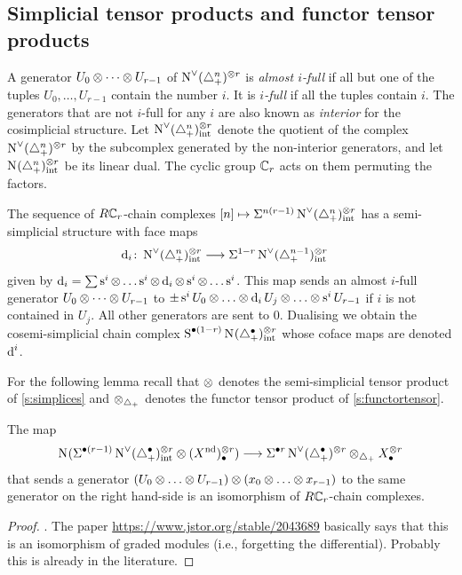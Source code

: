\subsection{Simplicial tensor products and functor tensor products}
A generator $U_0\otimes\cdots \otimes U_{r-1}$ of $\operatorname{N}^\vee_{}(\triangle_{+}^n)^{\otimes r}$ is \emph{almost $i$-full} if all but one of the tuples $U_0,\ldots,U_{r-1}$ contain the number $i$. It is \emph{$i$-full} if all the tuples contain $i$. The generators that are not $i$-full for any $i$ are also known as \emph{interior} for the cosimplicial structure. Let $\operatorname{N}^\vee_{}(\triangle_{+}^n)^{\otimes r}_{\mathrm{int}}$ denote the quotient of the complex $\operatorname{N}^\vee_{}(\triangle_{+}^n)^{\otimes r}$ by the subcomplex generated by the non-interior generators, and let $\operatorname{N}_{}(\triangle_{+}^n)^{\otimes r}_{\mathrm{int}}$ be its linear dual. The cyclic group $\mathbb{C}_r$ acts on them permuting the factors.
\begin{definition}
	The sequence of $R\mathbb{C}_r$-chain complexes $[n]\mapsto \Sigma^{n(r-1)}\operatorname{N}^\vee_{}(\triangle_{+}^{n})^{\otimes r}_{\mathrm{int}}$ has a semi-simplicial structure with face maps 
	\begin{align*}
		\operatorname{d}_i\colon \operatorname{N}^\vee_{}(\triangle_{+}^n)^{\otimes r}_{\mathrm{int}} &\longrightarrow
		\Sigma^{1-r}\operatorname{N}^\vee_{}(\triangle_{+}^{n-1})^{\otimes r}_{\mathrm{int}}	
	\end{align*}
	given by $\operatorname{d}_i = \sum \operatorname{s}^i\otimes \ldots \operatorname{s}^i\otimes\operatorname{d}_i\otimes \operatorname{s}^i \otimes \ldots \operatorname{s}^i$. This map sends an almost $i$-full generator $U_0\otimes \cdots \otimes U_{r-1}$ to $\pm \operatorname{s}^iU_0\otimes\ldots\otimes \operatorname{d}_iU_j\otimes\ldots\otimes \operatorname{s}^iU_{r-1}$ if $i$ is not contained in $U_j$. All other generators are sent to $0$. Dualising we obtain the cosemi-simplicial chain complex $\operatorname{S}^{\bullet(1-r)}\operatorname{N}_{}(\triangle_{+}^\bullet)^{\otimes r}_{\mathrm{int}}$ whose coface maps are denoted $\operatorname{d}^i$.	
\end{definition}

 For the following lemma recall that $\otimes$ denotes the semi-simplicial tensor product of \cref{s:simplices} and $\otimes_{\triangle_{+}}$ denotes the functor tensor product of \cref{s:functortensor}.

\begin{lemma}\label{lemma:simp-cosimp}
	The map 
	\[\operatorname{N}_{}(\Sigma^{\bullet(r-1)}\operatorname{N}^\vee_{}(\triangle_{+}^\bullet)^{\otimes r}_{\mathrm{int}}\otimes (X^{\mathrm{nd}})^{\otimes r}_\bullet)
	\longrightarrow \Sigma^{\bullet r}\operatorname{N}^\vee_{}(\triangle_{+}^\bullet)^{\otimes r} \otimes_{\triangle_{+}} X ^{\otimes r}_\bullet\]
	that sends a generator $(U_0\otimes\ldots \otimes U_{r-1})\otimes (x_0\otimes\ldots\otimes x_{r-1})$ to the same generator on the right hand-side is an isomorphism of $R\mathbb{C}_r$-chain complexes.
\end{lemma}
\begin{proof}
	. The paper \url{https://www.jstor.org/stable/2043689} basically says that this is an isomorphism of graded modules (i.e., forgetting the differential). Probably this is already in the literature.
\end{proof}

